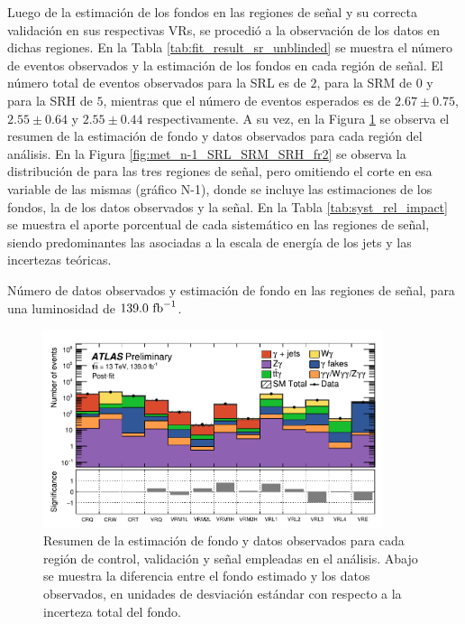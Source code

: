 Luego de la estimación de los fondos en las regiones de señal y su correcta validación en sus respectivas VRs, se procedió a la observación de los datos en dichas regiones. En la Tabla \ref{tab:fit_result_sr_unblinded} se muestra el número de eventos observados y la estimación de los fondos en cada región de señal. El número total de eventos observados para la SRL es de $2$, para la SRM de $0$ y para la SRH de $5$, mientras que el número de eventos esperados es de $2.67\pm0.75$, $2.55\pm0.64$ y $2.55\pm0.44$ respectivamente. A su vez, en la Figura \ref{fig:regions_pulls_unblinded} se observa el resumen de la estimación de fondo y datos observados para cada región del análisis. En la Figura \ref{fig:met_n-1_SRL_SRM_SRH_fr2} se observa la distribución de \met para las tres regiones de señal, pero omitiendo el corte en esa variable de las mismas (gráfico N-1), donde se incluye las estimaciones de los fondos, la de los datos observados y la señal. En la Tabla \ref{tab:syst_rel_impact} se muestra el aporte porcentual de cada sistemático en las regiones de señal, siendo predominantes las asociadas a la escala de energía de los jets y las incertezas teóricas.


\begin{table}[ht!]
  \centering
  \caption{Número de datos observados y estimación de fondo en las regiones de señal, para una luminosidad de $139.0\ \text{fb}^{-1}$.}
  
  \label{tab:fit_result_sr_unblinded}
\end{table}

\begin{figure}[ht!]
  \centering
  \includegraphics[width=0.89\textwidth]{images/results/regions_pull_significance_CR_VR.pdf}
  \caption{Resumen de la estimación de fondo y datos observados para cada región de control, validación y señal empleadas en el análisis. Abajo se muestra la diferencia entre el fondo estimado y los datos observados, en unidades de desviación estándar con respecto a la incerteza total del fondo.}
  \label{fig:regions_pulls_unblinded}
\end{figure}


